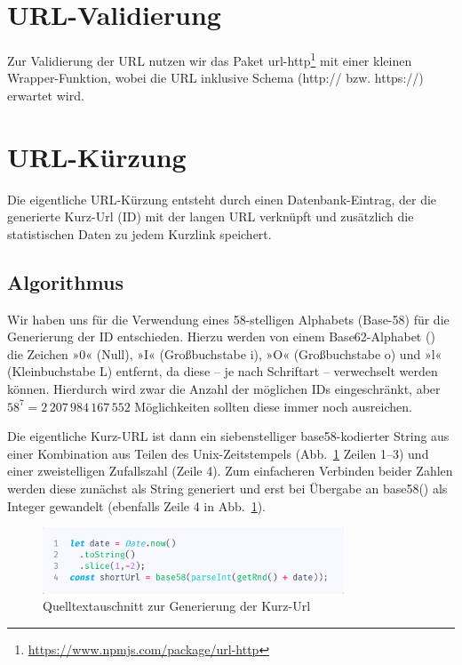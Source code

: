 \documentclass[a4paper,11pt,DIV=12,overfullrule=on]{scrreprt}
\begin{document}
\section{URL-Validierung}
Zur Validierung der URL nutzen wir das Paket {\ttfamily url-http}\footnote{\href{https://www.npmjs.com/package/url-http}{https://www.npmjs.com/package/url-http}} mit einer kleinen Wrapper-Funktion, wobei die URL inklusive Schema ({\ttfamily http://} bzw. {\ttfamily https://}) erwartet wird.
\section{URL-Kürzung}
Die eigentliche URL-Kürzung entsteht durch einen Datenbank-Eintrag, der die generierte Kurz-Url (ID) mit der langen URL verknüpft und zusätzlich die statistischen Daten zu jedem Kurzlink speichert.
\subsection{Algorithmus}
Wir haben uns für die Verwendung eines 58-stelligen Alphabets (Base-58) für die Generierung der ID entschieden. Hierzu werden von einem Base62-Alphabet ({\ttfamily[0–9A–Za–z]}) die Zeichen »0« (Null), »I« (Großbuchstabe i), »O« (Großbuchstabe o) und »l« (Kleinbuchstabe L) entfernt, da diese – je nach Schriftart – verwechselt werden können. Hierdurch wird zwar die Anzahl der möglichen IDs eingeschränkt, aber $58^7 =  2\,207\,984\,167\,552$ Möglichkeiten sollten diese immer noch ausreichen.

Die eigentliche Kurz-URL ist dann ein siebenstelliger base58-kodierter String aus einer Kombination aus Teilen des Unix-Zeitstempels (Abb.~\ref{fig:261shorturl} Zeilen 1–3) und einer zweistelligen Zufallszahl (Zeile 4). Zum einfacheren Verbinden beider Zahlen werden diese zunächst als String generiert und erst bei Übergabe an {\ttfamily base58()} als Integer gewandelt (ebenfalls Zeile 4 in Abb.~\ref{fig:261shorturl}).
\begin{figure}%
    \begin{small}%
        \begin{center}%
            \includegraphics[width=0.8\textwidth]{2_6_1_shortUrl.png}%
        \end{center}%
        \caption{Quelltextauschnitt zur Generierung der Kurz-Url}%
        \label{fig:261shorturl}%
    \end{small}%
\end{figure}%
\end{document}
